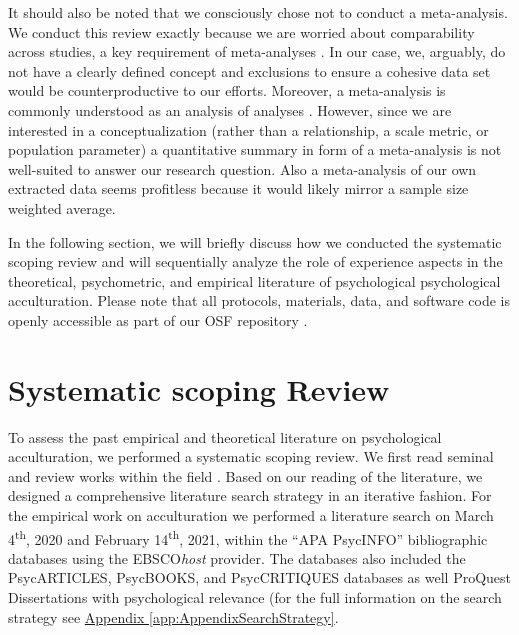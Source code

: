 \documentclass[man, 12pt, a4paper, mask]{apa7}
\begin{document}
It should also be noted that we consciously chose not to conduct a meta-analysis. We conduct this review exactly because we are worried about comparability across studies, a key requirement of meta-analyses \citep{Pogue1998}. In our case, we, arguably, do not have a clearly defined concept and exclusions to ensure a cohesive data set would be counterproductive to our efforts. Moreover, a meta-analysis is commonly understood as an analysis of analyses \citep{Glass1976}. However, since we are interested in a conceptualization (rather than a relationship, a scale metric, or population parameter) a quantitative summary in form of a meta-analysis is not well-suited to answer our research question. Also a meta-analysis of our own extracted data seems profitless because it would likely mirror a sample size weighted average.

In the following section, we will briefly discuss how we conducted the systematic scoping review and will sequentially analyze the role of experience aspects in the theoretical, psychometric, and empirical literature of psychological psychological acculturation. Please note that all protocols, materials, data, and software code is openly accessible as part of our OSF repository \citep[][]{Kreienkamp2021e}.


\section{Systematic scoping Review}
\newcommand{\nTheo}{92}
\newcommand{\nMeth}{233}
\newcommand{\nEmp}{526}

To assess the past empirical and theoretical literature on psychological
acculturation, we performed a systematic scoping review. We first read
seminal and review works within the field
\citep[including,][]{Ward2019, Berry1997b, Berry2003, Szapocznik1978, Sam2006a, Rudmin2003a}.
Based on our reading of the literature, we designed a comprehensive
literature search strategy in an iterative fashion. For the empirical
work on acculturation we performed a literature search on March
4\textsuperscript{th}, 2020 and February 14\textsuperscript{th}, 2021,
within the ``APA PsycINFO'' bibliographic databases using the
EBSCO\textit{host} provider. The databases also included the
PsycARTICLES, PsycBOOKS, and PsycCRITIQUES databases as well ProQuest
Dissertations with psychological relevance (for the full information on
the search strategy see
\hyperref[app:AppendixSearchStrategy]{Appendix \ref*{app:AppendixSearchStrategy}}.
\end{document}
